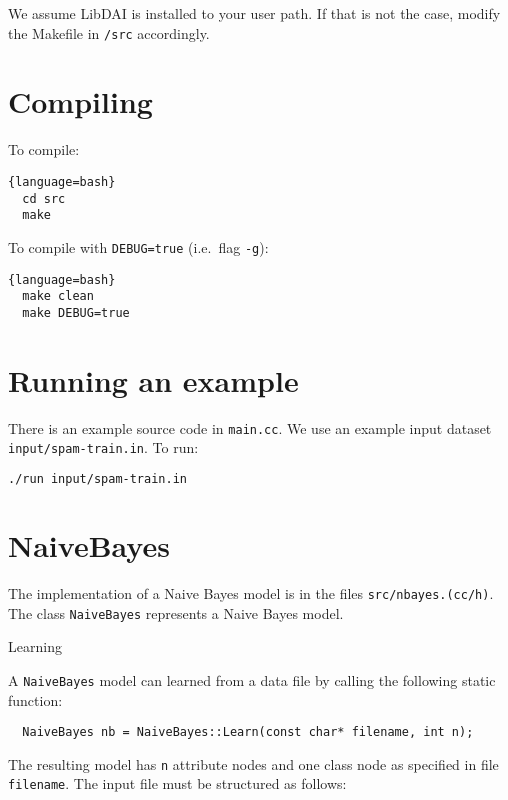 \documentclass{amsart}
\makeatletter
\def\subsection{\@startsection{subsection}{3}%
  \z@{.5\linespacing\@plus.7\linespacing}{.1\linespacing}%
  {\normalfont\itshape}}
\theoremstyle{plain}
\newcommand{\code}[1]{\lstinline[mathescape=true]{#1}}
\makeatother
\begin{document}
We assume LibDAI is installed to your user path. If that is not the case, modify the Makefile in
\code{/src} accordingly.

\section{Compiling}

To compile:

\begin{lstlisting}{language=bash}
  cd src
  make
\end{lstlisting}

To compile with \code{DEBUG=true} (i.e.\ flag \code{-g}):

\begin{lstlisting}{language=bash}
  make clean
  make DEBUG=true
\end{lstlisting}

\section{Running an example}

There is an example source code in \code{main.cc}. We use an example input dataset
\code{input/spam-train.in}. To run:

\begin{lstlisting}[language=bash]
  ./run input/spam-train.in
\end{lstlisting}

\section{NaiveBayes}

The implementation of a Naive Bayes model is in the files \code{src/nbayes.(cc/h)}. The class
\code{NaiveBayes} represents a Naive Bayes model.

\subsection{Learning}

A \code{NaiveBayes} model can learned from a data file by calling the following static function:

\begin{lstlisting}
  NaiveBayes nb = NaiveBayes::Learn(const char* filename, int n);
\end{lstlisting}

The resulting model has \code{n} attribute nodes and one class node as specified in file
\code{filename}. The input file must be structured as follows:
\end{document}
